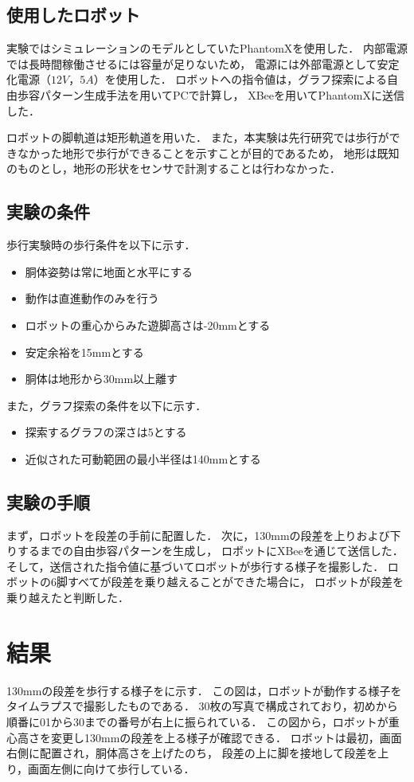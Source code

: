 \subsection{使用したロボット}
実験ではシミュレーションのモデルとしていたPhantomXを使用した．
内部電源では長時間稼働させるには容量が足りないため，
電源には外部電源として安定化電源（$12V，5A$）を使用した．
ロボットへの指令値は，グラフ探索による自由歩容パターン生成手法を用いてPCで計算し，
XBeeを用いてPhantomXに送信した．

ロボットの脚軌道は矩形軌道を用いた．
また，本実験は先行研究では歩行ができなかった地形で歩行ができることを示すことが目的であるため，
地形は既知のものとし，地形の形状をセンサで計測することは行わなかった．

\subsection{実験の条件}
歩行実験時の歩行条件を以下に示す．

\begin{itemize}
  \item 胴体姿勢は常に地面と水平にする
  \item 動作は直進動作のみを行う
  \item ロボットの重心からみた遊脚高さは-20mmとする
  \item 安定余裕を15mmとする
  \item 胴体は地形から30mm以上離す
\end{itemize}

また，グラフ探索の条件を以下に示す．

\begin{itemize}
  \item 探索するグラフの深さは5とする
  \item 近似された可動範囲の最小半径は140mmとする
\end{itemize}

\subsection{実験の手順}
まず，ロボットを段差の手前に配置した．
次に，130mmの段差を上りおよび下りするまでの自由歩容パターンを生成し，
ロボットにXBeeを通じて送信した．
そして，送信された指令値に基づいてロボットが歩行する様子を撮影した．
ロボットの6脚すべてが段差を乗り越えることができた場合に，
ロボットが段差を乗り越えたと判断した．

\section{結果}
130mmの段差を歩行する様子をに示す．
この図は，ロボットが動作する様子をタイムラプスで撮影したものである．
30枚の写真で構成されており，初めから順番に01から30までの番号が右上に振られている．
この図から，ロボットが重心高さを変更し130mmの段差を上る様子が確認できる．
ロボットは最初，画面右側に配置され，胴体高さを上げたのち，
段差の上に脚を接地して段差を上り，画面左側に向けて歩行している．

